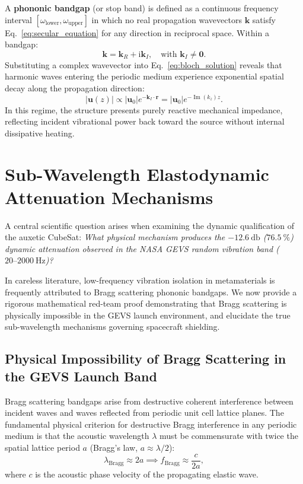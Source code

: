 A \textbf{phononic bandgap} (or stop band) is defined as a continuous frequency interval $[\omega_{\text{lower}}, \omega_{\text{upper}}]$ in which no real propagation wavevectors $\mathbf{k}$ satisfy Eq.~\eqref{eq:secular_equation} for any direction in reciprocal space. Within a bandgap:
\begin{equation}
\mathbf{k} = \mathbf{k}_R + \mathrm{i} \mathbf{k}_I, \quad \text{with } \mathbf{k}_I \ne \mathbf{0}.
\label{eq:complex_wavevector}
\end{equation}
Substituting a complex wavevector into Eq.~\eqref{eq:bloch_solution} reveals that harmonic waves entering the periodic medium experience exponential spatial decay along the propagation direction:
\begin{equation}
|\mathbf{u}(z)| \propto |\mathbf{u}_0| e^{-\mathbf{k}_I \cdot \mathbf{r}} = |\mathbf{u}_0| e^{-\operatorname{Im}(k_z) z}.
\label{eq:spatial_decay}
\end{equation}
In this regime, the structure presents purely reactive mechanical impedance, reflecting incident vibrational power back toward the source without internal dissipative heating.

\section{Sub-Wavelength Elastodynamic Attenuation Mechanisms}
\label{sec:subwavelength_mechanisms}

A central scientific question arises when examining the dynamic qualification of the auxetic CubeSat: \textit{What physical mechanism produces the $\SI{-12.6}{\decibel}$ ($\SI{76.5}{\percent}$) dynamic attenuation observed in the NASA GEVS random vibration band ($20\text{--}\SI{2000}{\hertz}$)?}

In careless literature, low-frequency vibration isolation in metamaterials is frequently attributed to Bragg scattering phononic bandgaps. We now provide a rigorous mathematical red-team proof demonstrating that Bragg scattering is physically impossible in the GEVS launch environment, and elucidate the true sub-wavelength mechanisms governing spacecraft shielding.

\subsection{Physical Impossibility of Bragg Scattering in the GEVS Launch Band}
\label{subsec:bragg_impossibility}

Bragg scattering bandgaps arise from destructive coherent interference between incident waves and waves reflected from periodic unit cell lattice planes. The fundamental physical criterion for destructive Bragg interference in any periodic medium is that the acoustic wavelength $\lambda$ must be commensurate with twice the spatial lattice period $a$ (Bragg's law, $a \approx \lambda / 2$):
\begin{equation}
\lambda_{\text{Bragg}} \approx 2 a \implies f_{\text{Bragg}} \approx \frac{c}{2 a},
\label{eq:bragg_condition}
\end{equation}
where $c$ is the acoustic phase velocity of the propagating elastic wave.


